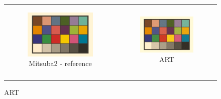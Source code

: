 \renewcommand\thesubfigure{\arabic{subfigure}}
\begin{figure}[h]
	\centering
	\begin{tabular}{cc}
		\begin{subfigure}
			{0.4\textwidth}\centering\includegraphics[width=\linewidth]{img/macbeth_chart_D50.png}
			\caption{Mitsuba2 - reference}
		\end{subfigure}
		&
		\begin{subfigure}
			{0.4\textwidth}\centering\includegraphics[width=\linewidth]{img/macbeth_chart_D50_ART.png}
			\caption{ART}
		\end{subfigure} \\
		\begin{subfigure}

\end{subfigure}
\end{tabular}
\end{figure}
